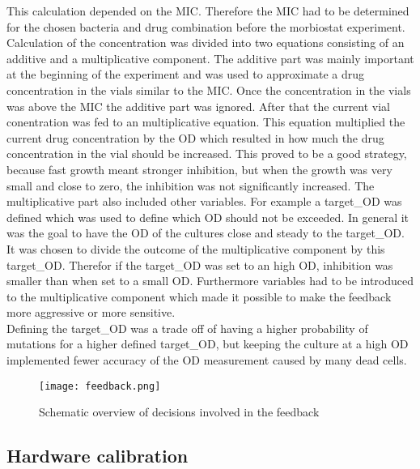 This calculation depended on the MIC. Therefore the MIC had to be determined for the chosen bacteria and drug combination before the morbiostat experiment. Calculation of the concentration was divided into two equations consisting of an additive and a multiplicative component. The additive part was mainly important at the beginning of the experiment and was used to approximate a drug concentration in the vials similar to the MIC. Once the concentration in the vials was above the MIC the additive part was ignored. After that the current vial conentration was fed to an multiplicative equation. This equation multiplied the current drug concentration by the \textDelta OD which resulted in how much the drug concentration in the vial should be increased. This proved to be a good strategy, because fast growth meant stronger inhibition, but when the growth was very small and close to zero, the inhibition was not significantly increased. The multiplicative part also included other variables. For example a target\_OD was defined which was used to define which OD should not be exceeded. In general it was the goal to have the OD of the cultures close and steady to the target\_OD. \\
It was chosen to divide the outcome of the multiplicative component by this target\_OD. Therefor if the target\_OD was set to an high OD, inhibition was smaller than when set to a small OD. Furthermore variables had to be introduced to the multiplicative component which made it possible to make the feedback more aggressive or more sensitive.\\
Defining the target\_OD was a trade off of having a higher probability of mutations for a higher defined target\_OD, but keeping the culture at a high OD implemented fewer accuracy of the OD measurement caused by many dead cells.  


\begin{figure}
	\texttt{[image: feedback.png]}
	\caption{Schematic overview of decisions involved in the feedback}
	\label{figure:feedback}
\end{figure}

\subsection{Hardware calibration}
